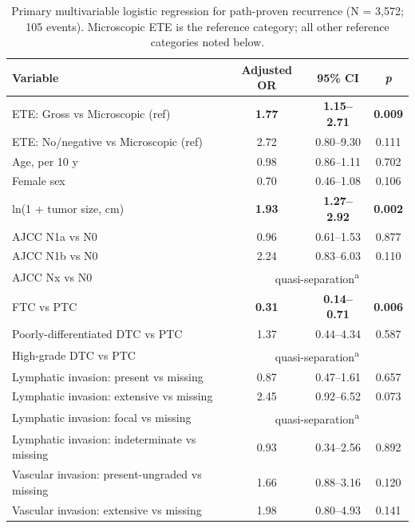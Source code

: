 \begin{table}[htbp]
\centering
\caption{Primary multivariable logistic regression for path-proven recurrence (N = 3{,}572; 105 events). Microscopic ETE is the reference category; all other reference categories noted below.}
\label{tab:primary}
\begin{threeparttable}
\begin{tabular}{@{}lccc@{}}
\toprule
\textbf{Variable} & \textbf{Adjusted OR} & \textbf{95\% CI} & \textbf{\textit{p}} \\
\midrule
ETE: Gross vs Microscopic (ref) & \textbf{1.77} & \textbf{1.15--2.71} & \textbf{0.009} \\
ETE: No/negative vs Microscopic (ref) & 2.72 & 0.80--9.30 & 0.111 \\
Age, per 10 y & 0.98 & 0.86--1.11 & 0.702 \\
Female sex & 0.70 & 0.46--1.08 & 0.106 \\
ln(1 + tumor size, cm) & \textbf{1.93} & \textbf{1.27--2.92} & \textbf{0.002} \\
AJCC N1a vs N0 & 0.96 & 0.61--1.53 & 0.877 \\
AJCC N1b vs N0 & 2.24 & 0.83--6.03 & 0.110 \\
AJCC Nx vs N0 & \multicolumn{3}{c}{quasi-separation\textsuperscript{a}} \\
FTC vs PTC & \textbf{0.31} & \textbf{0.14--0.71} & \textbf{0.006} \\
Poorly-differentiated DTC vs PTC & 1.37 & 0.44--4.34 & 0.587 \\
High-grade DTC vs PTC & \multicolumn{3}{c}{quasi-separation\textsuperscript{a}} \\
Lymphatic invasion: present vs missing & 0.87 & 0.47--1.61 & 0.657 \\
Lymphatic invasion: extensive vs missing & 2.45 & 0.92--6.52 & 0.073 \\
Lymphatic invasion: focal vs missing & \multicolumn{3}{c}{quasi-separation\textsuperscript{a}} \\
Lymphatic invasion: indeterminate vs missing & 0.93 & 0.34--2.56 & 0.892 \\
Vascular invasion: present-ungraded vs missing & 1.66 & 0.88--3.16 & 0.120 \\
Vascular invasion: extensive vs missing & 1.98 & 0.80--4.93 & 0.141 \\

\end{tabular}
\end{threeparttable}
\end{table}
